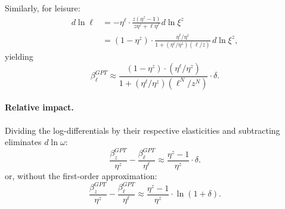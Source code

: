 \documentclass[12pt]{article}
\begin{document}
Similarly, for leisure:
\begin{align*}
d\ln\ell
&=-\eta^\ell\cdot\frac{z(\eta^z-1)}{z\eta^z+\ell\eta^\ell}d\ln\xi^z\\
&=(1-\eta^z)\cdot\frac{\eta^\ell/\eta^z}{1+\left(\eta^\ell/\eta^z\right)\left(\ell/z\right)}\,d\ln\xi^z,
\end{align*}
yielding
\begin{equation}
\label{eq:app_betal}
\beta_\ell^{GPT}
\approx
\frac{(1-\eta^z)\cdot\left(\eta^\ell/\eta^z\right)}{1+\left(\eta^\ell/\eta^z\right)\left(\ell^N/z^N\right)}\cdot \delta.
\end{equation}

\paragraph{Relative impact.}
Dividing the log-differentials by their respective elasticities and subtracting eliminates $d\ln\omega$:
\begin{equation}
\frac{\beta_z^{GPT}}{\eta^z}-\frac{\beta_\ell^{GPT}}{\eta^\ell}
\approx
\frac{\eta^z-1}{\eta^z}\cdot \delta.
\end{equation}
or, without the first-order approximation:
\begin{equation}
\label{eq:app_difference}
\frac{\beta_z^{GPT}}{\eta^z}-\frac{\beta_\ell^{GPT}}{\eta^\ell}
\approx
\frac{\eta^z-1}{\eta^z}\cdot \ln(1+ \delta).
\end{equation}


\end{document}
